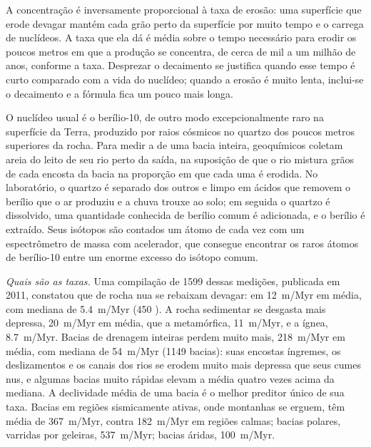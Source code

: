 A concentração é inversamente proporcional à taxa de erosão: uma superfície que erode devagar mantém cada grão perto da superfície por muito tempo e o carrega de nuclídeos. A taxa que ela dá é média sobre o tempo necessário para erodir os poucos metros em que a produção se concentra, de cerca de mil a um milhão de anos, conforme a taxa. Desprezar o decaimento se justifica quando esse tempo é curto comparado com a vida do nuclídeo; quando a erosão é muito lenta, inclui-se o decaimento e a fórmula fica um pouco mais longa.

\begin{inthelab}
O nuclídeo usual é o berílio-10, de outro modo excepcionalmente raro na superfície da Terra, produzido por raios cósmicos no quartzo dos poucos metros superiores da rocha. Para medir a  de uma bacia inteira, geoquímicos coletam areia do leito de seu rio perto da saída, na suposição de que o rio mistura grãos de cada encosta da bacia na proporção em que cada uma é erodida. No laboratório, o quartzo é separado dos outros  e limpo em ácidos que removem o berílio que o ar produziu e a chuva trouxe ao solo; em seguida
o quartzo é dissolvido, uma quantidade conhecida de berílio comum é adicionada, e o berílio é extraído. Seus isótopos são contados um átomo de cada vez com um espectrômetro de massa com acelerador, que consegue encontrar os raros átomos de berílio-10 entre um enorme excesso do isótopo comum.
\end{inthelab}

\emph{Quais são as taxas.} Uma compilação de \num{1599} dessas medições, publicada em 2011, constatou que  de rocha nua se rebaixam devagar: em \qty{12}{m/Myr} em média, com mediana de \qty{5.4}{m/Myr} (450 ). A rocha sedimentar se desgasta mais depressa, \qty{20}{m/Myr} em média, que a metamórfica, \qty{11}{m/Myr}, e a ígnea, \qty{8.7}{m/Myr}. Bacias de drenagem inteiras perdem muito mais, \qty{218}{m/Myr} em média, com mediana de \qty{54}{m/Myr} (\num{1149} bacias): suas encostas íngremes, os deslizamentos e os canais dos rios se erodem muito mais depressa que seus cumes nus, e algumas bacias muito rápidas elevam a média quatro vezes acima da mediana. A declividade média de uma bacia é o melhor preditor único de sua taxa. Bacias em regiões sismicamente ativas, onde montanhas se erguem, têm média de \qty{367}{m/Myr}, contra \qty{182}{m/Myr} em regiões calmas; bacias polares, varridas por geleiras, \qty{537}{m/Myr}; bacias áridas, \qty{100}{m/Myr}.

